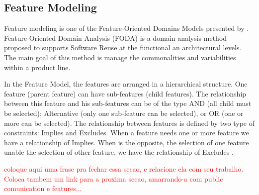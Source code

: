 
\subsection{Feature Modeling}

Feature modeling is one of the Feature-Oriented Domains Models presented by \cite{Kang1990}. Feature-Oriented Domain Analysis (FODA) is a domain analysis method proposed to supports Software Reuse \citep{krueger1992software} at the functional an architectural levels. The main goal of this method is manage the commonalities and variabilities within a product line.  

In the Feature Model, the features are arranged in a hierarchical structure. One feature (parent feature) can have sub-features (child features). The relationship between this feature and his sub-features can be of the type AND (all child must be selected); Alternative (only one sub-feature can be selected), or OR (one or more can be selected). The relationship between features is defined by two type of constraints: Implies and Excludes. When a feature needs one or more feature we have a relationship of Implies. When is the opposite, the selection of one feature unable the selection of other feature, we have the relationship of Excludes \citep{batory2005feature}.

\textcolor{red}{coloque aqui uma frase pra fechar essa secao, e relacione ela com seu trabalho. Coloca tambem um link para a proxima secao, amarrando-a com public comunication e features...}